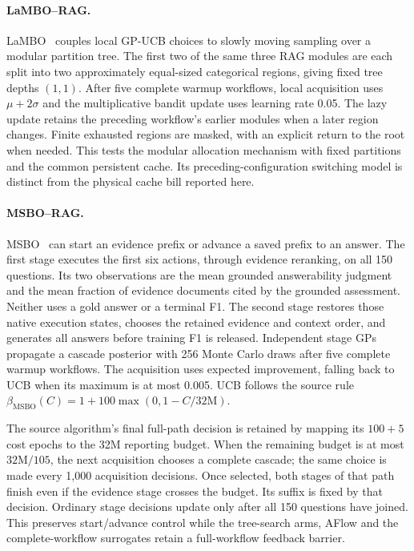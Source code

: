 \paragraph{LaMBO--RAG.}
LaMBO~\citep{lin2021lambo} couples local GP-UCB choices to slowly moving
sampling over a modular partition tree. The first two of the same three
RAG modules are each split into two approximately equal-sized categorical regions,
giving fixed tree depths $(1,1)$. After five complete warmup workflows,
local acquisition uses $\mu+2\sigma$ and the multiplicative bandit update
uses learning rate 0.05. The lazy update retains the preceding workflow's
earlier modules when a later region changes. Finite exhausted regions are
masked, with an explicit return to the root when needed. This tests the
modular allocation mechanism with fixed partitions and the common persistent
cache. Its preceding-configuration switching model is distinct from the
physical cache bill reported here.

\paragraph{MSBO--RAG.}
MSBO~\citep{torresi2026multistage} can start an evidence prefix or advance a
saved prefix to an answer. The first stage executes the first six actions,
through evidence reranking, on all 150 questions. Its two observations are
the mean grounded answerability judgment and the mean fraction of evidence
documents cited by the grounded assessment. Neither uses a gold answer or
a terminal F1. The second stage restores those native execution states,
chooses the retained evidence and context order, and generates all answers
before training F1 is released. Independent stage GPs propagate a cascade
posterior with 256 Monte Carlo draws after five complete warmup workflows.
The acquisition uses expected improvement, falling back to UCB when its
maximum is at most 0.005. UCB follows the source rule
$\beta_{\mathrm{MSBO}}(C)=1+100\max(0,1-C/32\mathrm{M})$.

The source algorithm's final full-path decision is retained by mapping its
$100+5$ cost epochs to the 32M reporting budget. When the remaining budget
is at most $32\mathrm{M}/105$, the next acquisition chooses a complete
cascade; the same choice is made every 1,000 acquisition decisions. Once
selected, both stages of that path finish even if the evidence stage crosses
the budget. Its suffix is fixed by that decision. Ordinary stage decisions
update only after all 150 questions have joined. This preserves
start/advance control while the tree-search arms, AFlow and the complete-workflow
surrogates retain a full-workflow feedback barrier.

